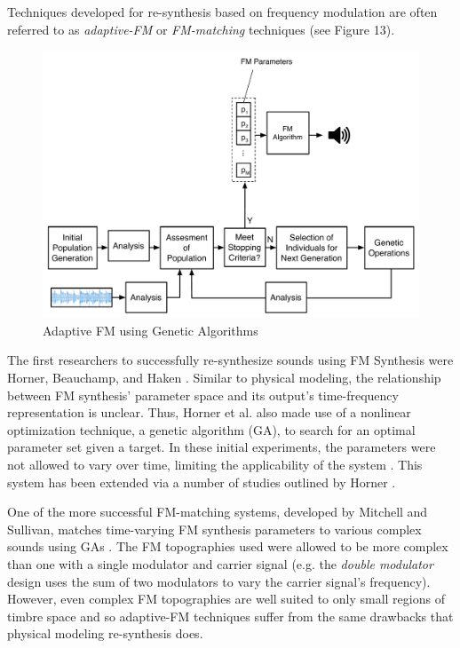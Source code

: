\documentclass[12pt]{report} 	%
\numberwithin{figure}{chapter}
\numberwithin{table}{chapter}
\numberwithin{equation}{chapter}
\begin{document}
\begin{flushleft}
Techniques developed for re-synthesis based on frequency modulation are often referred to as \textit{adaptive-FM} or \textit{FM-matching} techniques (see Figure 13). 
\begin{figure}[h!]
\begin{center}
\includegraphics[scale=0.50]{AdaptiveFM}
\caption[Adaptive FM]{Adaptive FM using Genetic Algorithms}
\end{center}
\end{figure}
The first researchers to successfully re-synthesize sounds using FM Synthesis were Horner, Beauchamp, and Haken \cite{Horner:1993il}. Similar to physical modeling, the relationship between FM synthesis' parameter space and its output's time-frequency representation is unclear. Thus, Horner et al. also made use of a nonlinear optimization technique, a genetic algorithm (GA), to search for an optimal parameter set given a target. In these initial experiments, the parameters were not allowed to vary over time, limiting the applicability of the system \cite[p. 22]{Horner:1993il}. This system has been extended via a number of studies outlined by Horner \cite{Horner:2003ov}. 

One of the more successful FM-matching systems, developed by Mitchell and Sullivan, matches time-varying FM synthesis parameters to various complex sounds using GAs \cite{Mitchell:2005ez}. The FM topographies used were allowed to be more complex than one with a single modulator and carrier signal (e.g. the \textit{double modulator} design uses the sum of two modulators to vary the carrier signal's frequency). However, even complex FM topographies are well suited to only small regions of timbre space and so adaptive-FM techniques suffer from the same drawbacks that physical modeling re-synthesis does.


\end{flushleft}
\end{document}
